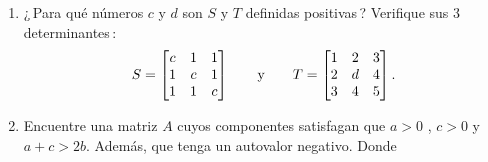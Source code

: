 \documentclass[12pt,a4paper]{article}
\newcommand\1{\mbox{\,\vrule height-0.8pt depth1.0pt width2pc\,}}
\newcommand\2{\mbox{\,\vrule height-0.8pt depth1.0pt width1pc\,}}
\newcommand\OG{\qquad\hbox{y}\qquad}
\begin{document}
\begin{enumerate}
%
\[ \hbox{\bf Pivotes $=$ cocientes de determinantes\qquad}
S=\begin{bmatrix} 2&2&0\\ 2&5&3\\ 0&3&8\end{bmatrix}.
\]
%
\item ¿\,Para qué números $c$ y $d$ son $S$ y $T$ definidas positivas\,?  Verifique sus $3$ determinantes\,:\linebreak
%
\[
S=\begin{bmatrix} c&1&1\\ 1&c&1\\ 1&1&c\end{bmatrix}\OG
T=\begin{bmatrix} 1&2&3\\ 2&d&4\\ 3&4&5\end{bmatrix}.
\]

\item Encuentre una matriz $A$ cuyos componentes satisfagan que $a>0$ , $c>0$ y $a+c>2b$. Además, que tenga un autovalor negativo. Donde


\end{enumerate}
\end{document}
